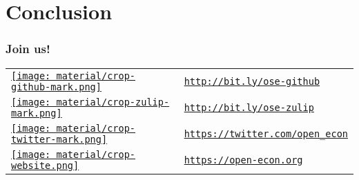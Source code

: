 \section{Conclusion}
\begin{frame}\frametitle{Join us!}\vspace{1.25cm}

\vspace{-0.75cm}


	\begin{table}[]
		\begin{tabularx}{1\textwidth}{>{\centering\arraybackslash}m{1.5cm} >{\arraybackslash}m{5cm}}
			\href{http://bit.ly/ose-github}{\texttt{[image: material/crop-github-mark.png]}} & 
			\href{http://bit.ly/ose-github}{\texttt{http://bit.ly/ose-github}} \\[1cm]
			
			\href{http://bit.ly/ose-zulip}{\texttt{[image: material/crop-zulip-mark.png]}} & 
			\href{http://bit.ly/ose-zulip}{\texttt{http://bit.ly/ose-zulip}}    \\[0.8cm]
			
			\href{https://twitter.com/open_econ}{\texttt{[image: material/crop-twitter-mark.png]}} & 
			\href{https://twitter.com/open_econ}{\texttt{https://twitter.com/open\_econ}} \\[0.8cm]
			
			\href{https://open-econ.org}{\texttt{[image: material/crop-website.png]}} & \href{https://open-econ.org}{\texttt{https://open-econ.org}}
		\end{tabularx}
	\end{table}

	


 \end{frame}

